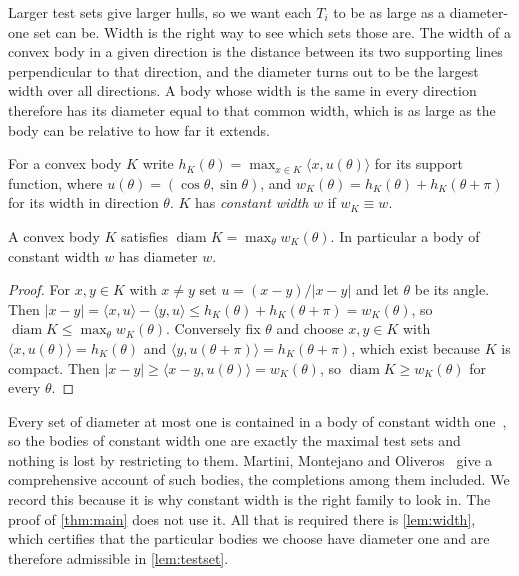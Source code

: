 \documentclass[a4paper,UKenglish,cleveref,autoref,thm-restate,numberwithinsect]{lipics-v2021}
\begin{document}
Larger test sets give larger hulls, so we want each $T_i$ to be as large as a
diameter-one set can be. Width is the right way to see which sets those are. The
width of a convex body in a given direction is the distance between its two
supporting lines perpendicular to that direction, and the diameter turns out to
be the largest width over all directions. A body whose width is the same in every
direction therefore has its diameter equal to that common width, which is as
large as the body can be relative to how far it extends.

For a convex body $K$ write $h_K(\theta)=\max_{x\in K}\langle x,u(\theta)\rangle$
for its support function, where $u(\theta)=(\cos\theta,\sin\theta)$, and
$w_K(\theta)=h_K(\theta)+h_K(\theta+\pi)$ for its width in direction $\theta$.
$K$ has \emph{constant width} $w$ if $w_K\equiv w$.

\begin{lemma}
\label{lem:width}
A convex body $K$ satisfies
$\operatorname{diam} K=\max_{\theta}w_K(\theta)$. In particular a body of constant
width $w$ has diameter $w$.
\end{lemma}

\begin{proof}
For $x,y\in K$ with $x\neq y$ set $u=(x-y)/|x-y|$ and let $\theta$ be its angle.
Then $|x-y|=\langle x,u\rangle-\langle y,u\rangle\le
h_K(\theta)+h_K(\theta+\pi)=w_K(\theta)$, so
$\operatorname{diam} K\le\max_\theta w_K(\theta)$. Conversely fix $\theta$ and
choose $x,y\in K$ with $\langle x,u(\theta)\rangle=h_K(\theta)$ and
$\langle y,u(\theta+\pi)\rangle=h_K(\theta+\pi)$, which exist because $K$ is
compact. Then
$|x-y|\ge\langle x-y,u(\theta)\rangle=w_K(\theta)$, so
$\operatorname{diam} K\ge w_K(\theta)$ for every $\theta$.
\end{proof}

\begin{remark}
\label{rem:completion}
Every set of diameter at most one is contained in a body of constant width
one~\cite{Grunbaum1963}, so the bodies of constant width one are exactly the
maximal test sets and nothing is lost by restricting to them. Martini, Montejano
and Oliveros~\cite{MartiniMontejanoOliveros2019} give a comprehensive account of
such bodies, the completions among them included. We record this
because it is why constant width is the right family to look in. The proof of
\cref{thm:main} does not use it. All that is required there is
\cref{lem:width}, which certifies that the particular bodies we choose have
diameter one and are therefore admissible in \cref{lem:testset}.
\end{remark}
\end{document}
